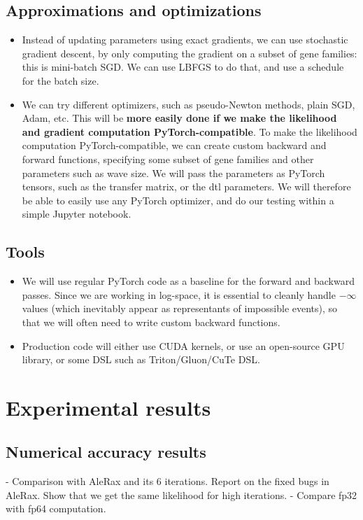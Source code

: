 \documentclass{article}
\newcommand{\1}{\mathbf{1}}
\begin{document}
\subsection{Approximations and optimizations}
\begin{itemize}
    \item Instead of updating parameters using exact gradients, we can use stochastic gradient descent, by only computing the gradient on a subset of gene families: this is mini-batch SGD. We can use LBFGS to do that, and use a schedule for the batch size.
    \item We can try different optimizers, such as pseudo-Newton methods, plain SGD, Adam, etc. This will be \textbf{more easily done if we make the likelihood and gradient computation PyTorch-compatible}. To make the likelihood computation PyTorch-compatible, we can create custom backward and forward functions, specifying some subset of gene families and other parameters such as wave size. We will pass the parameters as PyTorch tensors, such as the transfer matrix, or the dtl parameters. We will therefore be able to easily use any PyTorch optimizer, and do our testing within a simple Jupyter notebook.
\end{itemize}
\subsection{Tools}
\begin{itemize}
    \item We will use regular PyTorch code as a baseline for the forward and backward passes. Since we are working in log-space, it is essential to cleanly handle $-\infty$ values (which inevitably appear as representants of impossible events), so that we will often need to write custom backward functions.
    \item Production code will either use CUDA kernels, or use an open-source GPU library, or some DSL such as Triton/Gluon/CuTe DSL.
\end{itemize}


\section{Experimental results}
\subsection{Numerical accuracy results}
- Comparison with AleRax and its 6 iterations. Report on the fixed bugs in AleRax. Show that we get the same likelihood for high iterations.
- Compare fp32 with fp64 computation.
\end{document}
